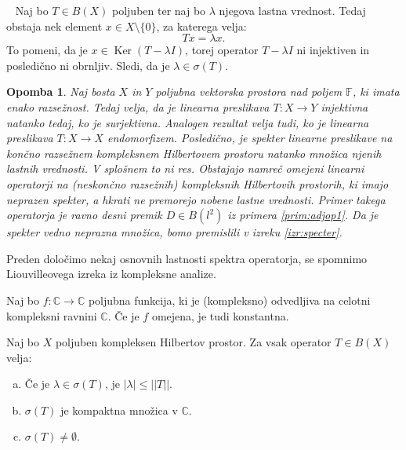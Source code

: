 \documentclass[12pt,a4paper,oneside,fleqn,openany]{book}
\newtheorem{opomba}[izrek]{Opomba}
\newcommand{\eopf}{\raisebox{0.8ex}{\framebox{}}} %
\newenvironment{dokaz}%
{\noindent{\bf Dokaz.}\ }%
{\hfill\eopf\par\bigskip}%
\newcommand{\F}{\mathbb{F}}
\newcommand{\C}{\mathbb{C}}
\newcommand{\abs}[1]{\ensuremath{\lvert #1 \rvert}}
\newcommand{\norm}[1]{\abs{\abs{#1}}}
\newcommand{\map}[3]{\ensuremath{{#1}:{#2}\rightarrow{#3}}}
\begin{document}
\begin{dokaz}
	Naj bo $T\in B(X)$ poljuben ter naj bo $\lambda$ njegova lastna vrednost. Tedaj obstaja nek element $x\in X\setminus\{0\}$, za katerega velja: $$Tx = \lambda x.$$ To pomeni, da je $x\in \operatorname{Ker}(T-\lambda I)$, torej operator $T - \lambda I$ ni injektiven in posledično ni obrnljiv. Sledi, da je $\lambda\in\sigma(T)$.
\end{dokaz}

\begin{opomba}
	\label{opomb:eigeninspecter}
	Naj bosta $X$ in $Y$ poljubna vektorska prostora nad poljem $\F$, ki imata enako razsežnost. Tedaj velja, da je linearna preslikava $\map{T}{X}{Y}$ injektivna natanko tedaj, ko je surjektivna. Analogen rezultat velja tudi, ko je linearna preslikava $\map{T}{X}{X}$ endomorfizem. Posledično, je spekter linearne preslikave na končno razsežnem kompleksnem Hilbertovem prostoru natanko množica njenih lastnih vrednosti. V splošnem to ni res. Obstajajo namreč omejeni linearni operatorji na (neskončno razsežnih) kompleksnih Hilbertovih prostorih, ki imajo neprazen spekter, a hkrati ne premorejo nobene lastne vrednosti. Primer takega operatorja je ravno desni premik $D\in B(l^2)$ iz primera \ref{prim:adjop1}. Da je spekter vedno neprazna množica, bomo premislili v izreku \ref{izr:specter}.
\end{opomba}

Preden določimo nekaj osnovnih lastnosti spektra operatorja, se spomnimo Liouvilleovega izreka iz kompleksne analize.

\begin{izrek}[Liouvilleov]
	\label{izr:Liouville}
	Naj bo $\map{f}{\C}{\C}$ poljubna funkcija, ki je (kompleksno) odvedljiva na celotni kompleksni ravnini $\C$. Če je $f$ omejena, je tudi konstantna.
\end{izrek}

\begin{izrek}
	\label{izr:specter}
	Naj bo $X$ poljuben kompleksen Hilbertov prostor. Za vsak operator $T\in B(X)$ velja: \begin{enumerate}[a)]
		\item Če je $\lambda\in\sigma(T)$, je $\abs{\lambda}\leq\norm{T}$.
		\item $\sigma(T)$ je kompaktna množica v $\C$.
		\item $\sigma(T)\neq \emptyset$.
	\end{enumerate}
\end{izrek}
\end{document}
